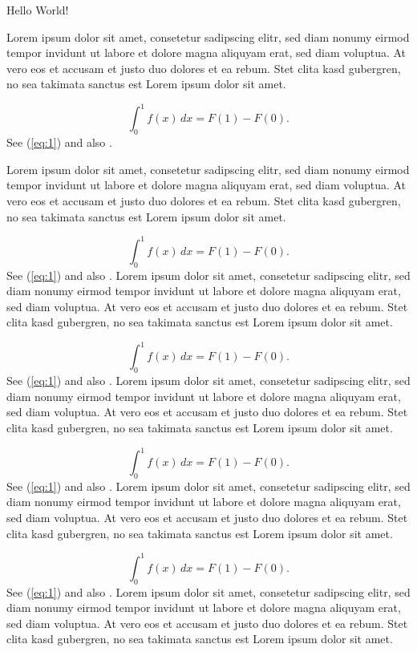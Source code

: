 \documentclass{article}
\begin{document}
Hello World!

Lorem ipsum dolor sit amet, consetetur sadipscing elitr, sed diam nonumy eirmod
tempor invidunt ut labore et dolore magna aliquyam erat, sed diam voluptua. At
vero eos et accusam et justo duo dolores et ea rebum. Stet clita kasd
gubergren, no sea takimata sanctus est Lorem ipsum dolor sit amet.

\begin{equation}\label{eq:1}
\int_0^1 f(x) \,dx = F(1)-F(0). 
\end{equation}
See (\ref{eq:1}) and also \cite{book}.

Lorem ipsum dolor sit amet, consetetur sadipscing elitr, sed diam nonumy eirmod
tempor invidunt ut labore et dolore magna aliquyam erat, sed diam voluptua. At
vero eos et accusam et justo duo dolores et ea rebum. Stet clita kasd
gubergren, no sea takimata sanctus est Lorem ipsum dolor sit amet.

\begin{equation}\label{eq:1}
\int_0^1 f(x) \,dx = F(1)-F(0). 
\end{equation}
See (\ref{eq:1}) and also \cite{book}.
Lorem ipsum dolor sit amet, consetetur sadipscing elitr, sed diam nonumy eirmod
tempor invidunt ut labore et dolore magna aliquyam erat, sed diam voluptua. At
vero eos et accusam et justo duo dolores et ea rebum. Stet clita kasd
gubergren, no sea takimata sanctus est Lorem ipsum dolor sit amet.

\begin{equation}\label{eq:1}
\int_0^1 f(x) \,dx = F(1)-F(0). 
\end{equation}
See (\ref{eq:1}) and also \cite{book}.
Lorem ipsum dolor sit amet, consetetur sadipscing elitr, sed diam nonumy eirmod
tempor invidunt ut labore et dolore magna aliquyam erat, sed diam voluptua. At
vero eos et accusam et justo duo dolores et ea rebum. Stet clita kasd
gubergren, no sea takimata sanctus est Lorem ipsum dolor sit amet.

\begin{equation}\label{eq:1}
\int_0^1 f(x) \,dx = F(1)-F(0). 
\end{equation}
See (\ref{eq:1}) and also \cite{book}.
Lorem ipsum dolor sit amet, consetetur sadipscing elitr, sed diam nonumy eirmod
tempor invidunt ut labore et dolore magna aliquyam erat, sed diam voluptua. At
vero eos et accusam et justo duo dolores et ea rebum. Stet clita kasd
gubergren, no sea takimata sanctus est Lorem ipsum dolor sit amet.

\begin{equation}\label{eq:1}
\int_0^1 f(x) \,dx = F(1)-F(0). 
\end{equation}
See (\ref{eq:1}) and also \cite{book}.
Lorem ipsum dolor sit amet, consetetur sadipscing elitr, sed diam nonumy eirmod
tempor invidunt ut labore et dolore magna aliquyam erat, sed diam voluptua. At
vero eos et accusam et justo duo dolores et ea rebum. Stet clita kasd
gubergren, no sea takimata sanctus est Lorem ipsum dolor sit amet.
\end{document}
